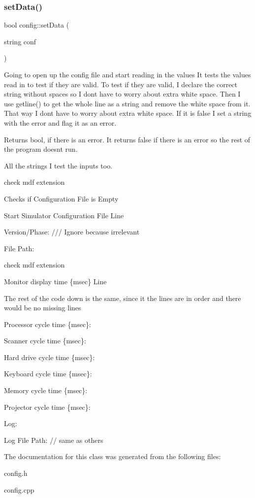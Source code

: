 \subsubsection{\texorpdfstring{setData()}{setData()}}
{\footnotesize\ttfamily bool config\+::set\+Data (\begin{DoxyParamCaption}\item[{string}]{conf }\end{DoxyParamCaption})}



Going to open up the config file and start reading in the values It tests the values read in to test if they are valid. To test if they are valid, I declare the correct string without spaces so I don\textquotesingle{}t have to worry about extra white space. Then I use getline() to get the whole line as a string and remove the white space from it. That way I don\textquotesingle{}t have to worry about extra white space. If it is false I set a string with the error and flag it as an error. 

\begin{DoxyReturn}{Returns}
bool, if there is an error. It returns false if there is an error so the rest of the program doesn\textquotesingle{}t run. 
\end{DoxyReturn}
All the strings I test the inputs too.

check mdf extension

Checks if Configuration File is Empty

Start Simulator Configuration File Line

Version/\+Phase\+: /// Ignore because irrelevant

File Path\+:

check mdf extension

Monitor display time \{msec\} Line

The rest of the code down is the same, since it the lines are in order and there would be no missing lines

Processor cycle time \{msec\}\+:

Scanner cycle time \{msec\}\+:

Hard drive cycle time \{msec\}\+:

Keyboard cycle time \{msec\}\+:

Memory cycle time \{msec\}\+:

Projector cycle time \{msec\}\+:

Log\+:

Log File Path\+: // same as others 

The documentation for this class was generated from the following files\+:\begin{DoxyCompactItemize}
\item 
config.\+h\item 
config.\+cpp\end{DoxyCompactItemize}
